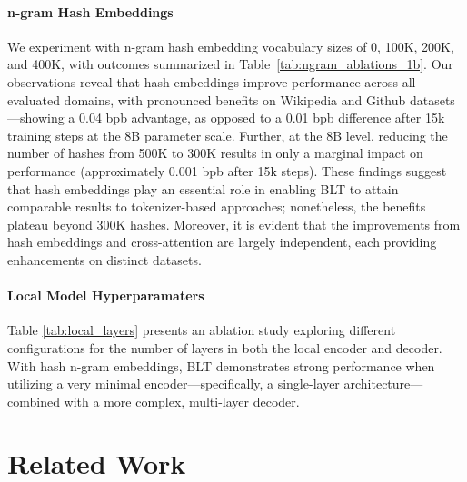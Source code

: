 \paragraph{n-gram Hash Embeddings} 

We experiment with n-gram hash embedding vocabulary sizes of 0, 100K, 200K, and 400K, with outcomes summarized in Table~\ref{tab:ngram_ablations_1b}. Our observations reveal that hash embeddings improve performance across all evaluated domains, with pronounced benefits on Wikipedia and Github datasets—showing a 0.04 bpb advantage, as opposed to a 0.01 bpb difference after 15k training steps at the 8B parameter scale. Further, at the 8B level, reducing the number of hashes from 500K to 300K results in only a marginal impact on performance (approximately 0.001 bpb after 15k steps). These findings suggest that hash embeddings play an essential role in enabling {\textsc BLT} to attain comparable results to tokenizer-based approaches; nonetheless, the benefits plateau beyond 300K hashes. Moreover, it is evident that the improvements from hash embeddings and cross-attention are largely independent, each providing enhancements on distinct datasets.

\paragraph{Local Model Hyperparamaters} Table \ref{tab:local_layers} presents an ablation study exploring different configurations for the number of layers in both the local encoder and decoder. With hash n-gram embeddings, {\textsc BLT} demonstrates strong performance when utilizing a very minimal encoder—specifically, a single-layer architecture—combined with a more complex, multi-layer decoder.

\section{Related Work}
\label{section:related_work}

